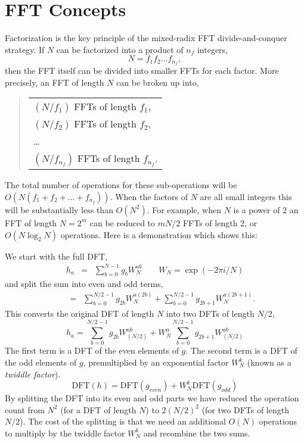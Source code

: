 \documentclass[fleqn,12pt]{article}
\begin{document}
\section{FFT Concepts}
%
Factorization is the key principle of the mixed-radix FFT divide-and-conquer
strategy. If $N$ can be factorized into a product of $n_f$ integers,
%
\begin{equation}
N = f_1 f_2 ... f_{n_f} ,
\end{equation}
%
then the FFT itself can be divided into smaller FFTs for each factor.
More precisely, an FFT of length $N$ can be broken up into,
%
\begin{quote}
\begin{tabular}{l}
$(N/f_1)$ FFTs of length $f_1$, \\
$(N/f_2)$ FFTs of length $f_2$, \\
\dots \\
$(N/f_{n_f})$ FFTs of length $f_{n_f}$. 
\end{tabular}
\end{quote}
%
The total number of operations for these sub-operations will be $O(
N(f_1 + f_2 + ... + f_{n_f}))$. When the factors of $N$ are all small
integers this will be substantially less than $O(N^2)$. For example,
when $N$ is a power of 2 an FFT of length $N=2^m$ can be reduced to $m
N/2$ FFTs of length 2, or $O(N\log_2 N)$ operations.  Here is a
demonstration which shows this:

We start with the full DFT,
%
\begin{eqnarray}
h_a &=& \sum_{b=0}^{N-1} g_b W_N^{ab}       \qquad W_N=\exp(-2\pi i/N)
\end{eqnarray}
%
and split the sum into even and odd terms,
%
\begin{eqnarray}
\phantom{h_a}
   &=& \sum_{b=0}^{N/2-1} g_{2b} W_N^{a(2b)} + 
      \sum_{b=0}^{N/2-1} g_{2b+1} W_N^{a(2b+1)}.
\end{eqnarray}
%
This converts the original DFT of length $N$ into two DFTs of length
$N/2$,
%
\begin{equation}
h_a = \sum_{b=0}^{N/2-1} g_{2b} W_{(N/2)}^{ab} + 
      W_N^a \sum_{b=0}^{N/2-1} g_{2b+1} W_{(N/2)}^{ab} 
\end{equation}
%
The first term is a DFT of the even elements of $g$. The second term
is a DFT of the odd elements of $g$, premultiplied by an exponential
factor $W_N^k$ (known as a {\em twiddle factor}).
%
\begin{equation}
\mathrm{DFT}(h)  =  \mathrm{DFT}(g_{even}) + W_N^k \mathrm{DFT}(g_{odd})
\end{equation}
%
By splitting the DFT into its even and odd parts we have reduced the
operation count from $N^2$ (for a DFT of length $N$) to $2 (N/2)^2$
(for two DFTs of length $N/2$). The cost of the splitting is that we
need an additional $O(N)$ operations to multiply by the twiddle factor
$W_N^k$ and recombine the two sums.
\end{document}
